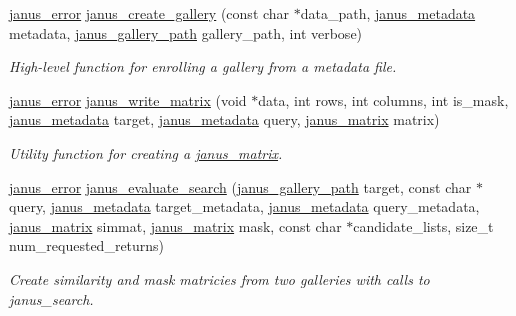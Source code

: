 \begin{DoxyCompactItemize}
\hyperlink{group__janus_ga1b275e4dade484951b366f785597b8f6}{janus\+\_\+error} \hyperlink{group__janus__io_gac00b6fe86d3b66dbc65a80842d5f7da7}{janus\+\_\+create\+\_\+gallery} (const char $\ast$data\+\_\+path, \hyperlink{group__janus__io_gaeddd0e276eebe8616d41808eed8dff16}{janus\+\_\+metadata} metadata, \hyperlink{group__janus_ga59a8cde3e9e96f7e337f9e1ebf5b4eac}{janus\+\_\+gallery\+\_\+path} gallery\+\_\+path, int verbose)
\begin{DoxyCompactList}\small\item\em High-\/level function for enrolling a gallery from a metadata file. \end{DoxyCompactList}\item 
\hyperlink{group__janus_ga1b275e4dade484951b366f785597b8f6}{janus\+\_\+error} \hyperlink{group__janus__io_ga48915adf796413b4e6a48cb41cba6065}{janus\+\_\+write\+\_\+matrix} (void $\ast$data, int rows, int columns, int is\+\_\+mask, \hyperlink{group__janus__io_gaeddd0e276eebe8616d41808eed8dff16}{janus\+\_\+metadata} target, \hyperlink{group__janus__io_gaeddd0e276eebe8616d41808eed8dff16}{janus\+\_\+metadata} query, \hyperlink{group__janus__io_ga3d3454709ac3ce27a99d42444408f16d}{janus\+\_\+matrix} matrix)
\begin{DoxyCompactList}\small\item\em Utility function for creating a \hyperlink{group__janus__io_ga3d3454709ac3ce27a99d42444408f16d}{janus\+\_\+matrix}. \end{DoxyCompactList}\item 
\hyperlink{group__janus_ga1b275e4dade484951b366f785597b8f6}{janus\+\_\+error} \hyperlink{group__janus__io_gaf478fa71592fe8de815545057ac03b15}{janus\+\_\+evaluate\+\_\+search} (\hyperlink{group__janus_ga59a8cde3e9e96f7e337f9e1ebf5b4eac}{janus\+\_\+gallery\+\_\+path} target, const char $\ast$query, \hyperlink{group__janus__io_gaeddd0e276eebe8616d41808eed8dff16}{janus\+\_\+metadata} target\+\_\+metadata, \hyperlink{group__janus__io_gaeddd0e276eebe8616d41808eed8dff16}{janus\+\_\+metadata} query\+\_\+metadata, \hyperlink{group__janus__io_ga3d3454709ac3ce27a99d42444408f16d}{janus\+\_\+matrix} simmat, \hyperlink{group__janus__io_ga3d3454709ac3ce27a99d42444408f16d}{janus\+\_\+matrix} mask, const char $\ast$candidate\+\_\+lists, size\+\_\+t num\+\_\+requested\+\_\+returns)
\begin{DoxyCompactList}\small\item\em Create similarity and mask matricies from two galleries with calls to janus\+\_\+search. \end{DoxyCompactList}\item 

\end{DoxyCompactItemize}

